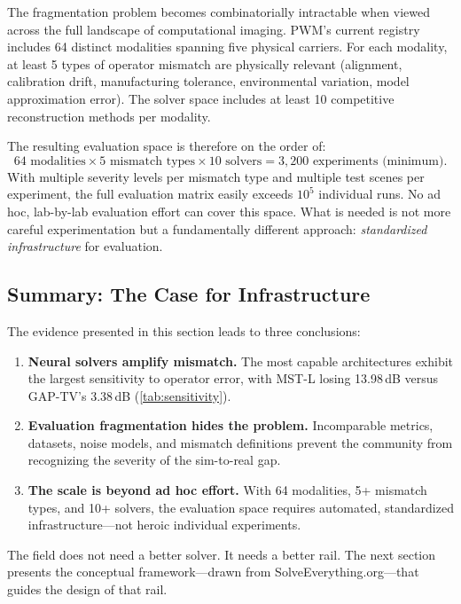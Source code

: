 The fragmentation problem becomes combinatorially intractable when
viewed across the full landscape of computational imaging.
PWM's current registry includes 64 distinct modalities spanning five
physical carriers.
For each modality, at least 5 types of operator mismatch are
physically relevant (alignment, calibration drift, manufacturing
tolerance, environmental variation, model approximation error).
The solver space includes at least 10 competitive reconstruction
methods per modality.

The resulting evaluation space is therefore on the order of:
\begin{equation}
  64 \text{ modalities} \times 5 \text{ mismatch types}
  \times 10 \text{ solvers}
  = 3{,}200 \text{ experiments (minimum)}.
\end{equation}
With multiple severity levels per mismatch type and multiple test
scenes per experiment, the full evaluation matrix easily exceeds
$10^5$ individual runs.
No ad hoc, lab-by-lab evaluation effort can cover this space.
What is needed is not more careful experimentation but a fundamentally
different approach: \emph{standardized infrastructure} for evaluation.


\subsection{Summary: The Case for Infrastructure}
\label{sec:problem_summary}

The evidence presented in this section leads to three conclusions:

\begin{enumerate}
  \item \textbf{Neural solvers amplify mismatch.}
        The most capable architectures exhibit the largest sensitivity to
        operator error, with MST-L losing 13.98\,dB versus GAP-TV's
        3.38\,dB (\cref{tab:sensitivity}).

  \item \textbf{Evaluation fragmentation hides the problem.}
        Incomparable metrics, datasets, noise models, and mismatch
        definitions prevent the community from recognizing the
        severity of the sim-to-real gap.

  \item \textbf{The scale is beyond ad hoc effort.}
        With 64 modalities, 5+ mismatch types, and 10+ solvers, the
        evaluation space requires automated, standardized
        infrastructure---not heroic individual experiments.
\end{enumerate}

The field does not need a better solver.
It needs a better rail.
The next section presents the conceptual framework---drawn from
SolveEverything.org---that guides the design of that rail.
